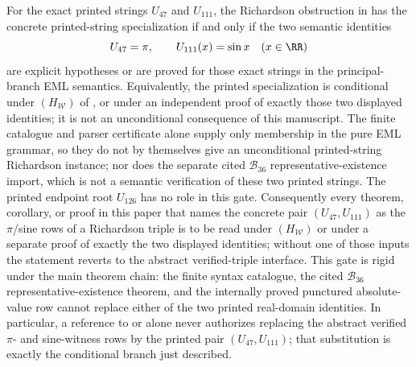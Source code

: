 \begin{theorem}
\label{thm:printed-richardson-gate-rigidity}
\label{prop:printed-pi-sine-instantiation-criterion}
\label{prop:no-unconditional-printed-pi-sine-instance}
For the exact printed strings \(U_{47}\) and \(U_{111}\), the Richardson
obstruction in
has the concrete printed-string specialization if and only if the two semantic
identities
\[
  U_{47}=\pi,
  \qquad
  U_{111}(x)=\sin x\quad(x\in\RR)
\]
are explicit hypotheses or are proved for those exact strings in the
principal-branch EML semantics.  Equivalently, the printed specialization is
conditional under \((H_{\mathcal W})\) of , or under an independent
proof of exactly those two displayed identities; it is not an unconditional
consequence of this manuscript.  The finite catalogue and parser certificate
alone supply only membership in the pure EML grammar, so they do not by
themselves give an unconditional printed-string Richardson instance; nor does
the separate cited \(\mathcal B_{36}\) representative-existence import, which is
not a semantic verification of these two printed strings.  The printed endpoint
root \(U_{126}\) has no role in this gate.  Consequently every theorem,
corollary, or proof in this paper that names the concrete pair
\((U_{47},U_{111})\) as the \(\pi\)/sine rows of a Richardson triple is to be read
under \((H_{\mathcal W})\) or under a separate proof of exactly the two displayed
identities; without one of those inputs the statement reverts to the abstract
verified-triple interface.  This gate is rigid under the main theorem chain: the
finite syntax catalogue, the cited \(\mathcal B_{36}\) representative-existence
theorem, and the internally proved punctured absolute-value row cannot replace
either of the two printed real-domain identities.
In particular, a reference to  or
 alone never authorizes replacing
the abstract verified \(\pi\)- and sine-witness rows by the printed pair
\((U_{47},U_{111})\); that substitution is exactly the conditional branch just
described.
\end{theorem}

